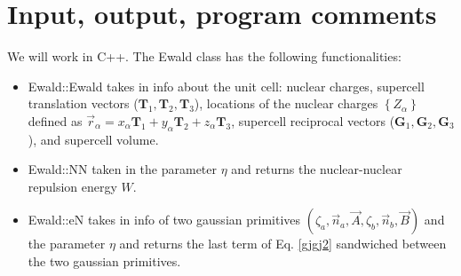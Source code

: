 \documentclass[11pt,a4paper]{article}
\begin{document}
\section{Input, output, program comments}
We will work in C++. The Ewald class has the following functionalities:
\begin{itemize}
\item Ewald::Ewald takes in info about the unit cell: nuclear charges, supercell translation vectors ($\mathbf{T}_1, \mathbf{T}_2,\mathbf{T}_3$), locations of the nuclear charges $\left\{ Z_{\alpha} \right\}$ defined as $\vec{r}_{\alpha} = x_{\alpha} \mathbf{T}_1 + y_{\alpha} \mathbf{T}_2 + z_{\alpha} \mathbf{T}_3$, supercell reciprocal vectors ($\mathbf{G}_1,\mathbf{G}_2,\mathbf{G}_3$), and supercell volume.
\item Ewald::NN taken in the parameter $\eta$ and returns the nuclear-nuclear repulsion energy $W$.
\item Ewald::eN takes in info of two gaussian primitives $(\zeta_a,\vec{n}_a,\vec{A},\zeta_b,\vec{n}_b,\vec{B})$ and the parameter $\eta$ and returns the last term of Eq. \eqref{gjgj2} sandwiched between the two gaussian primitives.
\end{itemize}
\end{document}
